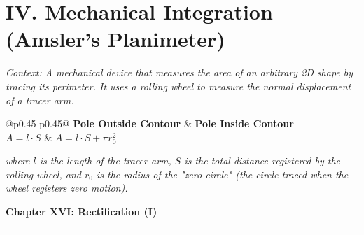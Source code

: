 \documentclass[11pt, a4paper]{article}
\begin{document}
\section*{\color{primary} IV. Mechanical Integration (Amsler's Planimeter)}

\textit{\small Context: A mechanical device that measures the area of an arbitrary 2D shape by tracing its perimeter. It uses a rolling wheel to measure the normal displacement of a tracer arm.}

\begin{center}
\begin{tabular}{@{}p{0.45\columnwidth} p{0.45\columnwidth}@{}}
\toprule
\textbf{Pole Outside Contour} & \textbf{Pole Inside Contour} \\
\midrule
$A = l \cdot S$ & $A = l \cdot S + \pi r_0^2$ \\
\bottomrule
\end{tabular}
\end{center}

\vspace{0.2cm}
\textit{\small where $l$ is the length of the tracer arm, $S$ is the total distance registered by the rolling wheel, and $r_0$ is the radius of the "zero circle" (the circle traced when the wheel registers zero motion).}

\newpage

\begin{center}
    {\LARGE \bfseries \color{accent} Chapter XVI: Rectification (I)}\\
    \vspace{0.2cm}
    {\color{accent}\rule{0.55\linewidth}{0.8pt}}
\end{center}
\vspace{0.35cm}

\begin{center}
\end{center}
\end{document}
